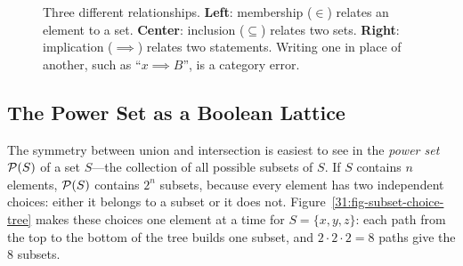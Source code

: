 \begin{figure}[htbp]
\caption{Three different relationships. \textbf{Left}: membership ($\in$) relates an element to a set. \textbf{Center}: inclusion ($\subseteq$) relates two sets. \textbf{Right}: implication ($\implies$) relates two statements. Writing one in place of another, such as ``$x \implies B$'', is a category error.}
\label{31:fig-membership-inclusion-implication}
\end{figure}

\subsection{The Power Set as a Boolean Lattice}

The symmetry between union and intersection is easiest to see in the \emph{power set} $\mathcal{P}(S)$ of a set $S$---the collection of all possible subsets of $S$. If $S$ contains $n$ elements, $\mathcal{P}(S)$ contains $2^n$ subsets, because every element has two independent choices: either it belongs to a subset or it does not. Figure~\ref{31:fig-subset-choice-tree} makes these choices one element at a time for $S = \{x, y, z\}$: each path from the top to the bottom of the tree builds one subset, and $2 \cdot 2 \cdot 2 = 8$ paths give the $8$ subsets.

